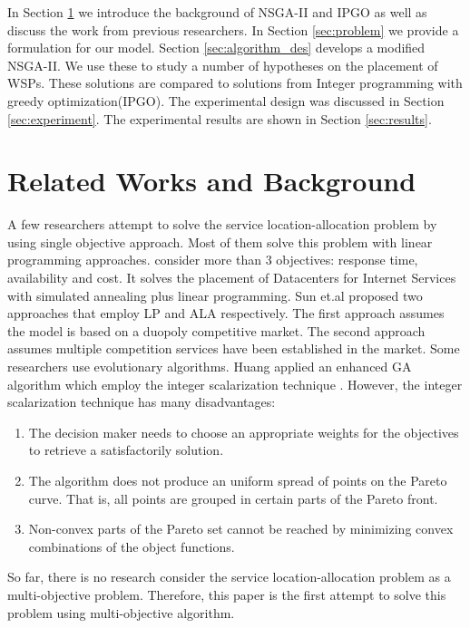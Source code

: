 \documentclass{llncs}
\begin{document}
In Section \ref{sec:Background} we introduce the background of NSGA-II and IPGO as well as discuss the work from previous researchers.
In Section \ref{sec:problem} we provide a formulation for our model. Section \ref{sec:algorithm_des} develops a modified NSGA-II. 
We use these to study a number of hypotheses on the placement of WSPs. These solutions are compared to solutions from Integer
programming with greedy optimization(IPGO). 
The experimental design was discussed in Section \ref{sec:experiment}. The experimental results are shown in Section \ref{sec:results}.


\section{Related Works and Background}
\label{sec:Background}
A few researchers attempt to solve the service location-allocation problem by using single objective approach. Most of them solve this problem with linear programming approaches.
\cite{5961695} consider more than 3 objectives: response time, availability and cost. It solves the placement of Datacenters for Internet Services with simulated annealing plus linear programming. Sun et.al proposed two approaches \cite{Aboolian} \cite{Sun} that employ LP and ALA respectively. The first approach \cite{Aboolian} assumes the model is based on a duopoly competitive market.
The second approach \cite{Sun} assumes multiple competition services have been established in the market.
Some researchers use evolutionary algorithms. Huang \cite{EnhancedGenetic} applied an enhanced GA algorithm which employ the integer scalarization technique \cite{Multiobjective}. However, 
the integer scalarization technique has many disadvantages:
\begin{enumerate}
	\item The decision maker needs to choose an appropriate weights for the objectives to retrieve a satisfactorily solution.
	\item The algorithm does not produce an uniform spread of points on the Pareto curve. That is, all points are grouped in certain parts of the Pareto front.
	\item Non-convex parts of the Pareto set cannot be reached by minimizing convex combinations of the object functions.
\end{enumerate}

So far, there is no research consider the service location-allocation problem as a multi-objective problem. Therefore, this paper is the first attempt to solve this problem using 
multi-objective algorithm.
\end{document}
